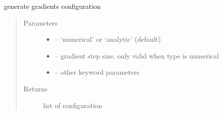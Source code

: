 \documentclass[letterpaper,10pt,english]{sphinxmanual}
\begin{document}
\begin{fulllineitems}

\begin{fulllineitems}
\label{\detokenize{src/apidocs/genopt:genopt.DakotaResponses.gradients}}
generate gradients configuration
\begin{quote}\begin{description}
\item[{Parameters}] \leavevmode\begin{itemize}
\item {} 
 -- `numerical' or `analytic' (default)

\item {} 
 -- gradient step size, only valid when type is numerical

\item {} 
 -- other keyword parameters

\end{itemize}

\item[{Returns}] \leavevmode
list of configuration

\end{description}\end{quote}

\end{fulllineitems}


\end{fulllineitems}

\end{document}
